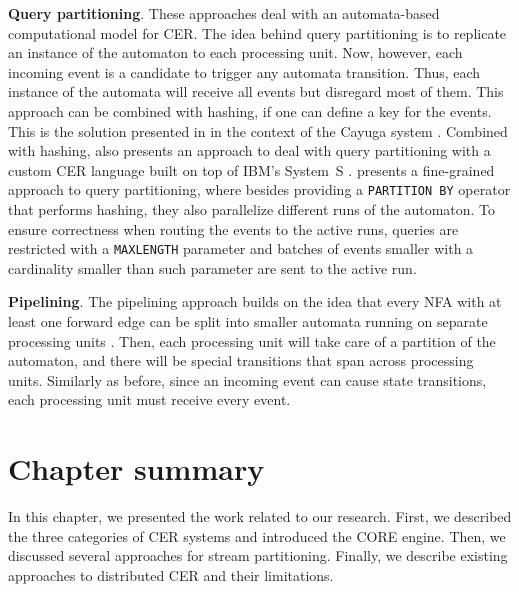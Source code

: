 \textbf{Query partitioning}. These approaches deal with an automata-based computational model for CER. The idea behind query partitioning is to replicate an instance of the automaton to each processing unit. Now, however, each incoming event is a candidate to trigger any automata transition. Thus, each instance of the automata will receive all events but disregard most of them. This approach can be combined with hashing, if one can define a key for the events. This is the solution presented in \cite{DBLP:conf/debs/BrennaGHJ09} in the context of the Cayuga system \cite{DBLP:conf/sigmod/BrennaDGHOPRTW07}. Combined with hashing, \cite{DBLP:conf/debs/Hirzel12} also presents an approach to deal with query partitioning with a custom CER language built on top of IBM's System~S \cite{DBLP:journals/toplas/Hirzel0G17}. \cite{DBLP:conf/debs/BalkesenDWT13} presents a fine-grained approach to query partitioning, where besides providing a \texttt{PARTITION BY} operator that performs hashing, they also parallelize different runs of the automaton. To ensure correctness when routing the events to the active runs, queries are restricted with a \texttt{MAXLENGTH} parameter and batches of events smaller with a cardinality smaller than such parameter are sent to the active run.

\textbf{Pipelining}. The pipelining approach builds on the idea that every NFA with at least one forward edge can be split into smaller automata running on separate processing units \cite{DBLP:conf/debs/BrennaGHJ09}. Then, each processing unit will take care of a partition of the automaton, and there will be special transitions that span across processing units. Similarly as before, since an incoming event can cause state transitions, each processing unit must receive every event.

\section{Chapter summary}

In this chapter, we presented the work related to our research. First, we described the three categories of CER systems and introduced the CORE engine. Then, we discussed several approaches for stream partitioning. Finally, we describe existing approaches to distributed CER and their limitations.
